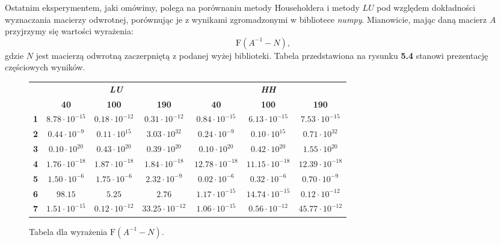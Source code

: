 Ostatnim eksperymentem, jaki omówimy, polega na porównaniu metody Householdera
i metody $LU$ pod względem dokładności wyznaczania macierzy odwrotnej,
porównując je z wynikami zgromadzonymi w bibliotece \textit{numpy}. Mianowicie,
mając daną macierz $A$ przyjrzymy się wartości wyrażenia:
$$\textrm{F}(A^{-1} - N),$$
gdzie $N$ jest macierzą odwrotną zaczerpniętą z podanej wyżej biblioteki. Tabela
przedstawiona na rysunku \textbf{5.4} stanowi prezentację częściowych wyników.
\begin{figure}[h!tb]
\begin{center}
\begin{tabular}{|l||c|c|c||c|c|c|}
\hline
\multirow{2}{*}{} & \multicolumn{3}{|c||}{\textbf{\textit{LU}}} & \multicolumn{3}{|c|}{\textbf{\textit{HH}}}\\
\cline{2-7}
& \textbf{40} & \textbf{100} & \textbf{190} & \textbf{40} & \textbf{100} & \textbf{190} \\
\hline
\hline
\textbf{1} & $8.78 \cdot 10^{-15}$ & $0.18 \cdot 10^{-12}$ & $0.31 \cdot 10^{-12}$ & $0.84 \cdot 10^{-15}$ & $6.13 \cdot 10^{-15}$ & $7.53 \cdot 10^{-15}$ \\
\hline
\textbf{2} & $0.44 \cdot 10^{-9}$ & $0.11 \cdot 10^{15}$ & $3.03 \cdot 10^{32}$ & $0.24 \cdot 10^{-9}$ & $0.10 \cdot 10^{15} $ & $0.71 \cdot 10^{32}$ \\
\hline
\textbf{3} & $0.10 \cdot 10^{20}$ & $0.43\cdot 10^{20}$ & $0.39\cdot 10^{20}$ & $0.10\cdot 10^{20}$ & $0.42\cdot 10^{20}$ & $1.55\cdot 10^{20}$ \\
\hline
\textbf{4} & $1.76 \cdot 10^{-18}$ & $1.87 \cdot 10^{-18}$ & $1.84 \cdot 10^{-18}$ & $12.78 \cdot 10^{-18}$ & $11.15 \cdot 10^{-18}$ & $12.39 \cdot 10^{-18}$ \\
\hline	
\textbf{5} & $1.50 \cdot 10^{-6}$ & $1.75 \cdot 10^{-6}$ & $2.32 \cdot 10^{-9}$ & $0.02 \cdot 10^{-6}$ & $0.32 \cdot 10^{-6}$ & $0.70 \cdot 10^{-9}$ \\
\hline
\textbf{6} & $98.15$ & $5.25$ & $2.76$ & $1.17 \cdot 10^{-15}$ & $14.74 \cdot 10^{-15}$ & $0.12 \cdot 10^{-12}$ \\
\hline
\textbf{7} & $1.51 \cdot 10^{-15}$ & $0.12 \cdot 10^{-12}$ & $33.25 \cdot 10^{-12}$ & $1.06 \cdot 10^{-15}$ & $0.56 \cdot 10^{-12}$ & $45.77 \cdot 10^{-12}$ \\
\hline
\end{tabular}
\caption{Tabela dla wyrażenia $\mathrm{F}(A^{-1}-N)$.} 
\end{center}
\end{figure}

